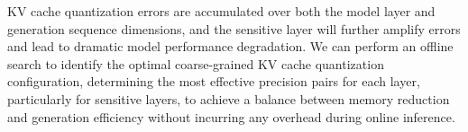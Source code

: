 KV cache quantization errors are accumulated over both the model layer and generation sequence dimensions, and the sensitive layer will further amplify errors and lead to dramatic model performance degradation. 
We can perform an offline search to identify the optimal coarse-grained KV cache quantization configuration, determining the most effective precision pairs for each layer, particularly for sensitive layers, to achieve a balance between memory reduction and generation efficiency without incurring any overhead during online inference.